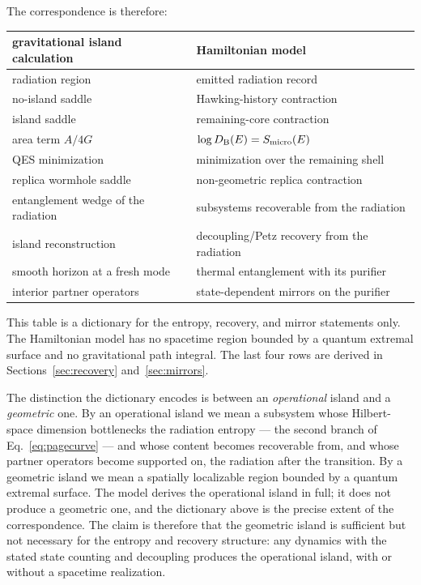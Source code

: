 \documentclass[12pt]{article}
\newcommand{\Smicro}{S_{\rm micro}}
\begin{document}
The correspondence is therefore:
\begin{center}
\begin{tabular}{ll}
\toprule
gravitational island calculation & Hamiltonian model \\
\midrule
radiation region & emitted radiation record \\
no-island saddle & Hawking-history contraction \\
island saddle & remaining-core contraction \\
area term $A/4G$ & $\log D_{\rm B}(E)=\Smicro(E)$ \\
QES minimization & minimization over the remaining shell \\
replica wormhole saddle & non-geometric replica contraction \\
entanglement wedge of the radiation & subsystems recoverable from the
radiation \\
island reconstruction & decoupling/Petz recovery from the radiation \\
smooth horizon at a fresh mode & thermal entanglement with its purifier \\
interior partner operators & state-dependent mirrors on the purifier \\
\bottomrule
\end{tabular}
\end{center}
This table is a dictionary for the entropy, recovery, and mirror statements
only.  The Hamiltonian model has no spacetime region bounded by a quantum
extremal surface and no gravitational path integral.  The last four rows are
derived in Sections~\ref{sec:recovery} and~\ref{sec:mirrors}.

The distinction the dictionary encodes is between an \emph{operational}
island and a \emph{geometric} one.  By an operational island we mean a
subsystem whose Hilbert-space dimension bottlenecks the radiation entropy
--- the second branch of Eq.~\eqref{eq:pagecurve} --- and whose content
becomes recoverable from, and whose partner operators become supported on,
the radiation after the transition.  By a geometric island we mean a
spatially localizable region bounded by a quantum extremal surface.  The
model derives the operational island in full; it does not produce a
geometric one, and the dictionary above is the precise extent of the
correspondence.  The claim is therefore that the geometric island is
sufficient but not necessary for the entropy and recovery structure: any
dynamics with the stated state counting and decoupling produces the
operational island, with or without a spacetime realization.
\end{document}

